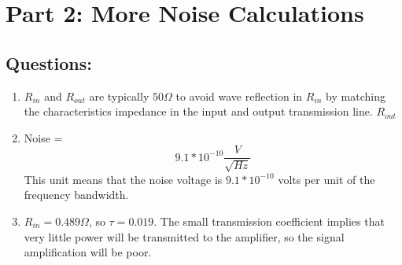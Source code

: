\documentclass{article} %
\begin{document}
\section*{Part 2: More Noise Calculations}

\subsection*{Questions:}
\begin{enumerate}
    \item $R_{in}$ and $R_{out}$ are typically $50 \Omega$ to avoid wave reflection in $R_{in}$ by matching the characteristics impedance in the input and output transmission line. $R_{out}$
    \item Noise =
          \[9.1*10^{-10} \frac{V}{\sqrt{Hz}}\]
          This unit means that the noise voltage is $9.1*10^{-10}$ volts per unit of the frequency bandwidth.
    \item $R_{in} = 0.489 \Omega$, so $\tau = 0.019$. The small transmission coefficient implies that very little power will be transmitted to the amplifier, so the signal amplification will be poor.
\end{enumerate}
\end{document}

